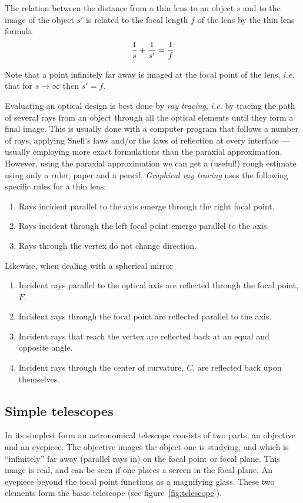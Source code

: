 The relation between the distance from a thin lens to an object $s$ and to the 
image of the object $s'$ is related to the focal length $f$ of the lens by the 
thin lens formula
\[
{1\over s}+{1\over s'}={1\over f}
\]

Note that a point infinitely far away is imaged at the focal point of the 
lens, {\it i.e.} that for $s\rightarrow\infty$ then $s'=f$. 

Evaluating an optical design is best done by {\it ray tracing}, {\it
  i.e.} by tracing the path of several rays from an object through all
the optical elements until they form a final image. This is usually
done with a computer program that follows a number of rays, applying
Snell's laws and/or the laws of reflection at every interface ---
usually employing more exact formulations than the paraxial
approximation. However, using the paraxial approximation we can get a
(useful!) rough estimate using only a ruler, paper and a pencil. {\it
  Graphical ray tracing} uses the following specific rules for a thin lens:
\begin{enumerate}
\item Rays incident parallel to the axis emerge through the right
  focal point.
\item Rays incident through the left focal point emerge parallel to the
  axis.
\item Rays through the vertex do not change direction.
\end{enumerate}
Likewise, when dealing with a spherical mirror
\begin{enumerate}
\item Incident rays parallel to the optical axis are reflected through
  the focal point, $F$.
\item Incident rays through the focal point are reflected parallel to
  the axis.
\item Incident rays that reach the vertex are reflected back at an
  equal and opposite angle.
\item Incident rays through the center of curvature, $C$, are
  reflected back upon themselves.
\end{enumerate}

\subsection{Simple telescopes}

In its simplest form an astronomical telescope consists of two parts, an 
objective and an eyepiece. The objective images the object one is studying,
and which is ``infinitely'' far away (parallel rays in) on the focal point
or focal plane. This image is real, and can be seen if one places a screen 
in the focal plane. An eyepiece beyond the focal point functions as a 
magnifying glass. These two elements form the basic telescope (see figure~\ref{fig:telescope}).

